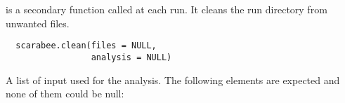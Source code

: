 %
\begin{Description}\relax
{} is a secondary function called at each  
run. It cleans the run directory from unwanted files. 
\end{Description}
%
\begin{Usage}
\begin{verbatim}
  scarabee.clean(files = NULL,
                 analysis = NULL)
\end{verbatim}
\end{Usage}
%
\begin{Arguments}
\begin{ldescription}
\item[\code{files}] A list of input used for the analysis. The following elements are
expected and none of them could be null: \begin{description}


\end{description}
\end{ldescription}
\end{Arguments}
